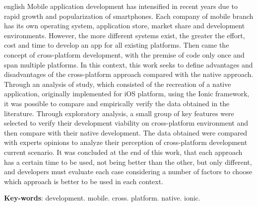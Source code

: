 \begin{resumo}[Abstract]
\begin{otherlanguage*}{english}
  Mobile application development has intensified in recent years due to rapid growth and popularization of smartphones. Each company of 
  mobile branch has its own operating system, application store, market share and development environments. 
  However, the more different systems exist, the greater the effort, cost and time to develop an app for all existing platforms. Then came the concept of cross-platform development, 
  with the premise of code only once and span multiple platforms. In this context, this work seeks to define advantages and disadvantages of the cross-platform approach 
  compared with the native approach. Through an analysis of study, which consisted of the recreation of a native application, originally implemented for iOS platform, 
  using the Ionic framework, it was possible to compare and empirically verify the data obtained in the literature. Through exploratory analysis, a small group of key features were selected 
  to verify their development viability on cross-platform environment and then compare with their native development. The data obtained were compared with experts opinions to 
  analyze their perception of cross-platform development current scenario. It was concluded at the end of this work, that each approach has a certain time 
  to be used, not being better than the other, but only different, and developers must evaluate each case considering a number of factors to choose which approach is better to be used in each context.

  \vspace{\onelineskip}

  \noindent 
  \textbf{Key-words}: development. mobile. cross. platform. native. ionic.
 \end{otherlanguage*}
\end{resumo}
